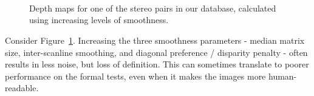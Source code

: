 \begin{figure}[h]
 \centering
 \\
 \\
 \\
 \caption[Depth maps for stereo pairs created with various parameters]{Depth
   maps for one of the stereo pairs in our database, calculated using increasing
   levels of smoothness.}
 \label{fig:stereo-pair-depth-maps}
\end{figure}

Consider Figure~\ref{fig:stereo-pair-depth-maps}. Increasing the three
smoothness parameters - median matrix size, inter-scanline smoothing, and
diagonal preference / disparity penalty - often results in less noise, but loss
of definition. This can sometimes translate to poorer performance on the
formal tests, even when it makes the images more human-readable.
